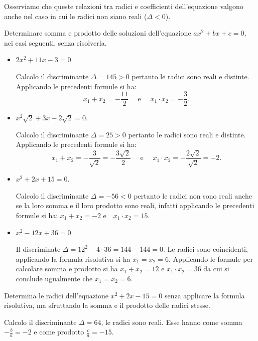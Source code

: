 Osserviamo che queste relazioni tra radici e coefficienti dell'equazione valgono anche nel caso in cui le radici non siano reali ($\Delta<0$).
\begin{exrig}
\begin{esempio}
Determinare somma e prodotto delle soluzioni dell'equazione $a x^{2} + b x +c = 0$, nei casi seguenti, senza risolverla.
 \begin{itemize}
 \item $2 x^{2} + 11 x - 3 = 0$.

 Calcolo il discriminante $\Delta = 145 > 0$ pertanto le radici sono reali e distinte. Applicando le precedenti formule si ha: 
\[x_{1} + x_{2} = - \frac{11}{2}\quad\text{ e }\quad x_{1} \cdot x_{2} = - \frac{3}{2}.\]

 \item $x^{2} \sqrt{2} + 3 x - 2 \sqrt{2} = 0$.
 
 Calcolo il discriminante $\Delta = 25 > 0$ pertanto le radici sono reali e distinte. Applicando le precedenti formule si ha: 
\[x_{1} + x_{2} = - \frac{3}{\sqrt{2}} = - \frac{3 \sqrt{2}}{2}\quad\text{ e }\quad x_{1} \cdot x_{2} = - \frac{2 \sqrt{2}}{\sqrt{2}} = - 2.\]

 \item $x^{2} + 2 x + 15 = 0$.

 Calcolo il discriminante $\Delta = - 56 < 0$ pertanto le radici non sono reali anche se la loro somma e il loro prodotto sono reali, infatti applicando le precedenti formule si ha: $x_{1} + x_{2} = - 2$ e~~$x_{1} \cdot x_{2} = 15$.

 \item $x^{2} - 12 x + 36 = 0$.

 Il discriminate $\Delta = 12^{2} - 4 \cdot 36 = 144 - 144 = 0$. Le radici sono coincidenti, applicando la formula risolutiva si ha $x_{1} = x_{2} = 6$. Applicando le formule per calcolare somma e prodotto si ha $x_{1} + x_{2} = 12$ e $x_{1} \cdot x_{2} = 36$ da cui si conclude ugualmente che $x_{1} = x_{2} = 6$.
 \end{itemize}
\end{esempio}

\begin{esempio}
Determina le radici dell'equazione $x^{2} + 2 x - 15 = 0$ senza applicare la formula risolutiva, ma sfruttando la somma e il prodotto delle radici stesse.

Calcolo il discriminante $\Delta = 64$, le radici sono reali. Esse hanno come somma~$- \frac{b}{a} = -2$ e come prodotto $\frac{c}{a} = -15$.


\end{esempio}
\end{exrig}
